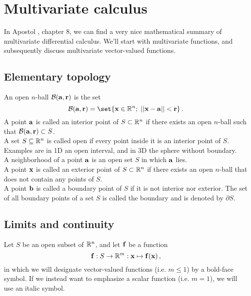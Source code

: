 \section{Multivariate calculus}
    In Apostol \cite{Apostol1969}, chapter 8, we can find a very nice mathematical summary of multivariate differential calculus. We'll start with multivariate functions, and subsequently discuss multivariate vector-valued functions.

    \subsection{Elementary topology}
        An open $n$-ball $\mathcal{B}(\vb{a}, \vb{r})$ is the set
        \begin{equation}
            \mathcal{B}(\vb{a}, \vb{r}) = \set{\vb{x} \in \R^n ; \thinspace \thinspace||\vb{x} - \vb{a}|| < \vb{r}} \thinspace .
        \end{equation}
        A point $\vb{a}$ is called an interior point of $S \subset \mathbb{R}^n$ if there exists an open $n$-ball such that \mbox{$\mathcal{B}(\vb{a}, \vb{r}) \subset S$}. \\

        A set $S \subseteq \mathbb{R}^n$ is called open if every point inside it is an interior point of $S$. Examples are in 1D an open interval, and in 3D the sphere without boundary. \\

        A neighborhood of a point $\vb{a}$ is an open set $S$ in which $\vb{a}$ lies. \\

        A point $\vb{x}$ is called an exterior point of $S \subset \mathbb{R}^n$ if there exists an open $n$-ball that does not contain any points of $S$. \\

        A point $\vb{b}$ is called a boundary point of $S$ if it is not interior nor exterior. The set of all boundary points of a set $S$ is called the boundary and is denoted by $\partial S$.

    \subsection{Limits and continuity}
        Let $S$ be an open subset of $\mathbb{R}^n$, and let $\vb{f}$ be a function
        \begin{equation}
            \vb{f}: S \rightarrow \mathbb{R}^m: \vb{x} \mapsto \vb{f}(\vb{x}) \thinspace ,
        \end{equation}
        in which we will designate vector-valued functions (i.e. $m \leq 1$) by a bold-face symbol. If we instead want to emphasize a scalar function (i.e. $m=1$), we will use an italic symbol. \\

